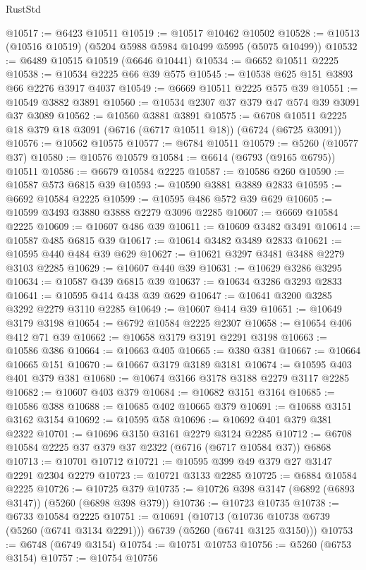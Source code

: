 \begin{lexlean}{RustStd}
\begin{coremodule}
@10517 := @6423 @10511
@10519 := @10517 @10462 @10502
@10528 := @10513 (@10516 @10519) (@5204 @5988 @5984 @10499 @5995 (@5075 @10499))
@10532 := @6489 @10515 @10519 (@6646 @10441)
@10534 := @6652 @10511 @2225
@10538 := @10534 @2225 @66 @39 @575
@10545 := @10538 @625 @151 @3893 @66 @2276 @3917 @4037
@10549 := @6669 @10511 @2225 @575 @39
@10551 := @10549 @3882 @3891
@10560 := @10534 @2307 @37 @379 @47 @574 @39 @3091 @37 @3089
@10562 := @10560 @3881 @3891
@10575 := @6708 @10511 @2225 @18 @379 @18 @3091 (@6716 (@6717 @10511 @18)) (@6724 (@6725 @3091))
@10576 := @10562 @10575
@10577 := @6784 @10511
@10579 := @5260 (@10577 @37)
@10580 := @10576 @10579
@10584 := @6614 (@6793 (@9165 @6795)) @10511
@10586 := @6679 @10584 @2225
@10587 := @10586 @260
@10590 := @10587 @573 @6815 @39
@10593 := @10590 @3881 @3889 @2833
@10595 := @6692 @10584 @2225
@10599 := @10595 @486 @572 @39 @629
@10605 := @10599 @3493 @3880 @3888 @2279 @3096 @2285
@10607 := @6669 @10584 @2225
@10609 := @10607 @486 @39
@10611 := @10609 @3482 @3491
@10614 := @10587 @485 @6815 @39
@10617 := @10614 @3482 @3489 @2833
@10621 := @10595 @440 @484 @39 @629
@10627 := @10621 @3297 @3481 @3488 @2279 @3103 @2285
@10629 := @10607 @440 @39
@10631 := @10629 @3286 @3295
@10634 := @10587 @439 @6815 @39
@10637 := @10634 @3286 @3293 @2833
@10641 := @10595 @414 @438 @39 @629
@10647 := @10641 @3200 @3285 @3292 @2279 @3110 @2285
@10649 := @10607 @414 @39
@10651 := @10649 @3179 @3198
@10654 := @6792 @10584 @2225 @2307
@10658 := @10654 @406 @412 @71 @39
@10662 := @10658 @3179 @3191 @2291 @3198
@10663 := @10586 @386
@10664 := @10663 @405
@10665 := @380 @381
@10667 := @10664 @10665 @151
@10670 := @10667 @3179 @3189 @3181
@10674 := @10595 @403 @401 @379 @381
@10680 := @10674 @3166 @3178 @3188 @2279 @3117 @2285
@10682 := @10607 @403 @379
@10684 := @10682 @3151 @3164
@10685 := @10586 @388
@10688 := @10685 @402 @10665 @379
@10691 := @10688 @3151 @3162 @3154
@10692 := @10595 @58
@10696 := @10692 @401 @379 @381 @2322
@10701 := @10696 @3150 @3161 @2279 @3124 @2285
@10712 := @6708 @10584 @2225 @37 @379 @37 @2322 (@6716 (@6717 @10584 @37)) @6868
@10713 := @10701 @10712
@10721 := @10595 @399 @49 @379 @27 @3147 @2291 @2304 @2279
@10723 := @10721 @3133 @2285
@10725 := @6884 @10584 @2225
@10726 := @10725 @379
@10735 := @10726 @398 @3147 (@6892 (@6893 @3147)) (@5260 (@6898 @398 @379))
@10736 := @10723 @10735
@10738 := @6733 @10584 @2225
@10751 := @10691
    (@10713 (@10736 @10738 @6739 (@5260 (@6741 @3134 @2291))) @6739 (@5260 (@6741 @3125 @3150)))
@10753 := @6748 (@6749 @3154)
@10754 := @10751 @10753
@10756 := @5260 (@6753 @3154)
@10757 := @10754 @10756

\end{coremodule}
\end{lexlean}

